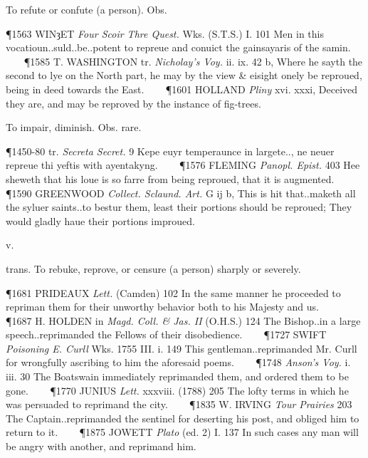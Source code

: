 \begin{description}[wide, labelwidth=!, labelindent=0pt]
\begin{myenumerate}
 To refute or confute (a person). Obs.

\P 1563 WINȝET  \textit{Four Scoir Thre Quest.} Wks. (S.T.S.) I. 101 Men in this vocatioun..suld..be..potent to repreue and conuict the gainsayaris of the samin.    
\P 1585 T. WASHINGTON tr.  \textit{Nicholay's Voy.} ii. ix. 42 b, Where he sayth the second to lye on the North part, he may by the view \& eisight onely be reproued, being in deed towards the East.    
\P 1601 HOLLAND  \textit{Pliny} xvi. xxxi, Deceived they are, and may be reproved by the instance of fig-trees.

 To impair, diminish. Obs. rare.

\P 1450-80 tr.  \textit{Secreta Secret.} 9 Kepe euyr temperaunce in largete.., ne neuer repreue thi yeftis with ayentakyng.    
\P 1576 FLEMING  \textit{Panopl. Epist.} 403 Hee sheweth that his loue is so farre from being reproued, that it is augmented.    
\P 1590 GREENWOOD  \textit{Collect. Sclaund. Art.} G ij b, This is hit that..maketh all the syluer saints..to bestur them, least their portions should be reproued; They would gladly haue their portions improued.
\end{myenumerate}


 v.

\noindent {}

\vspace{-0.3cm}

\begin{myenumerate}

 trans. To rebuke, reprove, or censure (a person) sharply or severely.

\P 1681 PRIDEAUX  \textit{Lett.} (Camden) 102 In the same manner he proceeded to repriman them for their unworthy behavior both to his Majesty and us.    
\P 1687 H. HOLDEN in  \textit{Magd. Coll. \& Jas. II} (O.H.S.) 124 The Bishop..in a large speech..reprimanded the Fellows of their disobedience.    
\P 1727 SWIFT  \textit{Poisoning E. Curll} Wks. 1755 III.  i. 149 This gentleman..reprimanded Mr. Curll for wrongfully ascribing to him the aforesaid poems.    
\P 1748  \textit{Anson's Voy.} i. iii. 30 The Boatswain immediately reprimanded them, and ordered them to be gone.    
\P 1770 JUNIUS  \textit{Lett.} xxxviii. (1788) 205 The lofty terms in which he was persuaded to reprimand the city.    
\P 1835 W. IRVING  \textit{Tour Prairies} 203 The Captain..reprimanded the sentinel for deserting his post, and obliged him to return to it.    
\P 1875 JOWETT  \textit{Plato} (ed. 2) I. 137 In such cases any man will be angry with another, and reprimand him.


\end{myenumerate}
\end{description}
